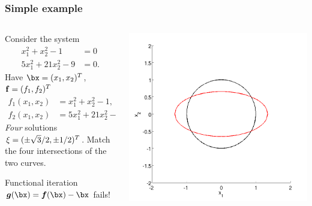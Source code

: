 \documentclass{beamer}
\newcommand{\bfm}[1]{{\boldsymbol{#1}}}
\begin{document}
\begin{frame}
  \frametitle{Simple example}

  \begin{columns}
    \begin{column}{0.5\textwidth}
      Consider the system
      \begin{align*}
        x_1^2 + x_2^2 - 1 & = 0 \\
        5 x_1^2 + 21 x_2^2 - 9 & = 0.
      \end{align*}
      Have $\bx = (x_1, x_2)^T$, ${\bf f} = (f_1,
      f_2)^T$
      \begin{align*}
        f_1(x_1, x_2) & = x_1^2 + x_2^2 - 1, \\
        f_2(x_1, x_2) & = 5 x_1^2 + 21 x_2^2 - 9.
      \end{align*} \pause
      \emph{Four} solutions ${\bf \xi} = (\pm \sqrt{3} /
      2, \pm 1 / 2)^T$. Match the four intersections of the
      two curves. \pause

      \vspace{1ex}

      Functional iteration $\bfm{g}(\bx) = \bfm{f}(\bx) - \bx$ fails!
    \end{column}
    \begin{column}{0.5\textwidth}
      \includegraphics[width=\textwidth]{figures/P1}
    \end{column}
  \end{columns}

\end{frame}
\end{document}
